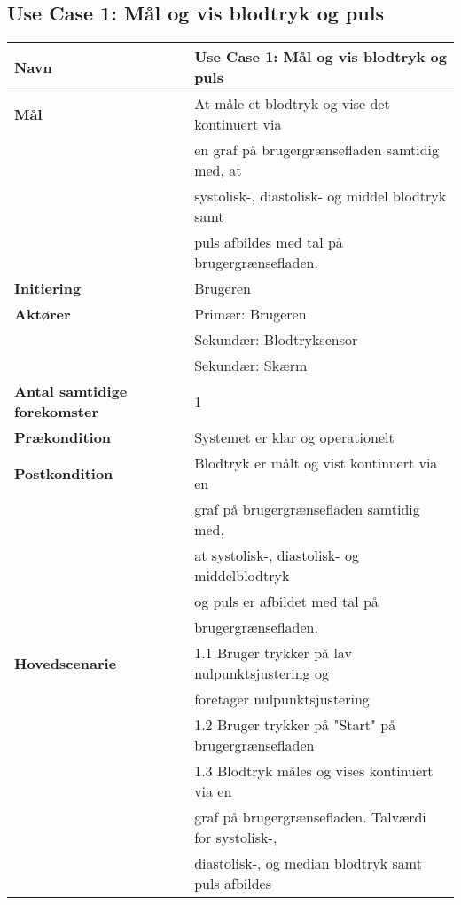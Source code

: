 \subsection{Use Case 1: Mål og vis blodtryk og puls}
\vspace{0.5 cm}
\begin{table}[h!]
	\begin{tabular}{l|l}
		\rowcolor[HTML]{A9D9F9} 
		\textbf{Navn} & Use Case 1: Mål og vis blodtryk og puls \\ \hline
		\textbf{Mål} & At måle et blodtryk og vise det kontinuert via \\
		& en graf på brugergrænsefladen samtidig med, at \\
		& systolisk-, diastolisk- og middel blodtryk samt \\
		& puls afbildes med tal på brugergrænsefladen. \\ \hline
		\rowcolor[HTML]{A9D9F9} 
		\textbf{Initiering} & Brugeren \\ \hline
		\textbf{Aktører} & Primær: Brugeren \\
		& Sekundær: Blodtryksensor \\
		& Sekundær: Skærm \\ \hline
		\rowcolor[HTML]{A9D9F9} 
		\textbf{Antal samtidige forekomster} & 1 \\ \hline
		\textbf{Prækondition} & Systemet er klar og operationelt \\ \hline
		\rowcolor[HTML]{A9D9F9} 
		\textbf{Postkondition} & Blodtryk er målt og vist kontinuert via en \\
		\rowcolor[HTML]{A9D9F9} 
		& graf på brugergrænsefladen samtidig med, \\
		\rowcolor[HTML]{A9D9F9} 
		& at systolisk-, diastolisk- og middelblodtryk \\
		\rowcolor[HTML]{A9D9F9} 
		& og puls er afbildet med tal på \\
		\rowcolor[HTML]{A9D9F9} 
		& brugergrænsefladen. \\ \hline
		\textbf{Hovedscenarie} & 1.1 Bruger trykker på lav nulpunktsjustering og \\
		& foretager nulpunktsjustering \\
		& 1.2 Bruger trykker på "Start" på brugergrænsefladen \\
		& 1.3 Blodtryk måles og vises kontinuert via en \\
		& graf på brugergrænsefladen. Talværdi for systolisk-, \\
		& diastolisk-, og median blodtryk samt puls afbildes \\

\end{tabular}
\end{table}
